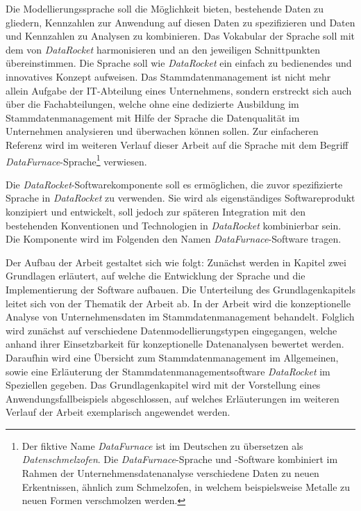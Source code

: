 \documentclass[
  language=german, %
  type=bachelor,%
  ngerman
]{isthesis}
\begin{document}
\begin{content}
  Die Modellierungssprache soll die Möglichkeit bieten, bestehende Daten zu
  gliedern, Kennzahlen zur Anwendung auf diesen Daten zu spezifizieren und
  Daten und Kennzahlen zu Analysen zu kombinieren. Das Vokabular der Sprache
  soll mit dem von \textit{DataRocket} harmonisieren und an den jeweiligen
  Schnittpunkten übereinstimmen.  Die Sprache soll wie \textit{DataRocket} ein
  einfach zu bedienendes und innovatives Konzept aufweisen. Das
  Stammdatenmanagement ist nicht mehr allein Aufgabe der IT-Abteilung eines
  Unternehmens, sondern erstreckt sich auch über die
  Fachabteilungen, welche ohne eine dedizierte Ausbildung im
  Stammdatenmanagement mit Hilfe der Sprache die Datenqualität im Unternehmen
  analysieren und überwachen können sollen. Zur einfacheren Referenz wird im
  weiteren Verlauf dieser Arbeit auf die Sprache mit dem Begriff
  \textit{DataFurnace}-Sprache\footnote{Der fiktive Name \textit{DataFurnace}
  ist im Deutschen zu übersetzen als \textit{Datenschmelzofen}. Die
  \textit{DataFurnace}-Sprache und -Software kombiniert im Rahmen der
  Unternehmensdatenanalyse verschiedene Daten zu neuen Erkentnissen, ähnlich
  zum Schmelzofen, in welchem beispielsweise Metalle zu neuen Formen
  verschmolzen werden.}  verwiesen.

  Die \textit{DataRocket}-Softwarekomponente soll es ermöglichen, die zuvor
  spezifizierte Sprache in \textit{DataRocket} zu verwenden. Sie wird als
  eigenständiges Softwareprodukt konzipiert und entwickelt, soll jedoch zur
  späteren Integration mit den bestehenden Konventionen und Technologien in
  \textit{DataRocket} kombinierbar sein. Die Komponente wird im Folgenden den
  Namen \textit{DataFurnace}-Software  tragen.

   Der Aufbau der Arbeit gestaltet sich wie folgt: Zunächst werden in Kapitel
   zwei Grundlagen erläutert, auf welche die Entwicklung der Sprache und die
   Implementierung der Software aufbauen. Die Unterteilung des
   Grundlagenkapitels leitet sich von der Thematik der Arbeit ab. In der Arbeit
   wird die konzeptionelle Analyse von Unternehmensdaten im
   Stammdatenmanagement behandelt. Folglich wird zunächst auf verschiedene
   Datenmodellierungstypen eingegangen, welche anhand ihrer Einsetzbarkeit für
   konzeptionelle Datenanalysen bewertet werden. Daraufhin wird eine Übersicht
   zum Stammdatenmanagement im Allgemeinen, sowie eine Erläuterung der
   Stammdatenmanagementsoftware \textit{DataRocket} im Speziellen gegeben. Das
   Grundlagenkapitel wird mit der Vorstellung eines Anwendungsfallbeispiels
   abgeschlossen, auf welches Erläuterungen im weiteren Verlauf der Arbeit
   exemplarisch angewendet werden.


\end{content}
\end{document}
